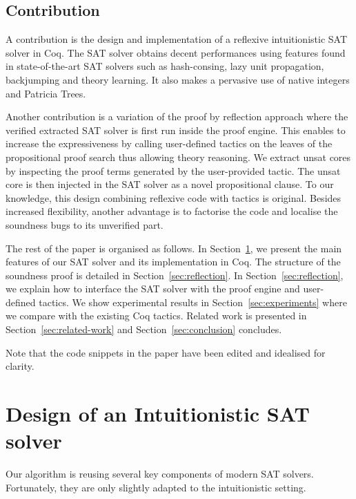\documentclass[utf8,a4paper,UKenglish,cleveref, autoref, thm-restate]{lipics-v2019}
\begin{document}
\subsection{Contribution}

A contribution is the design and implementation of a reflexive
intuitionistic SAT solver in Coq.  The SAT solver obtains decent
performances using features found in state-of-the-art SAT solvers such
as hash-consing, lazy unit propagation, backjumping and theory
learning. It also makes a pervasive use of native integers and
Patricia Trees.


Another contribution is a variation of the proof by reflection
approach where the verified extracted SAT solver is first run inside
the proof engine. This enables to increase the expressiveness by
calling user-defined tactics on the leaves of the propositional proof
search thus allowing theory reasoning.
%
We extract unsat cores by inspecting the proof terms generated by the
user-provided tactic. The unsat core is then injected in the SAT
solver as a novel propositional clause. To our knowledge, this design
combining reflexive code with tactics is original. Besides increased
flexibility, another advantage is to factorise the code and localise the
soundness bugs to its unverified part.

The rest of the paper is organised as follows.
%
In Section~\ref{sec:design}, we present the main features of our SAT
solver and its implementation in Coq.
%
The structure of the soundness proof is detailed in Section~\ref{sec:reflection}.
%
In Section~\ref{sec:reflection}, we explain how to interface the SAT
solver with the proof engine and  user-defined
tactics.
%
We show experimental results in Section~\ref{sec:experiments} where we
compare with the existing Coq tactics.
%
Related work is presented in Section~\ref{sec:related-work} and
Section~\ref{sec:conclusion} concludes.

Note that the code snippets in the paper have been edited and
idealised for clarity. 

\section{Design of an Intuitionistic SAT solver}
\label{sec:design}

Our algorithm is reusing several key components of modern SAT
solvers. Fortunately, they are only slightly adapted to the
intuitionistic setting.
\end{document}
